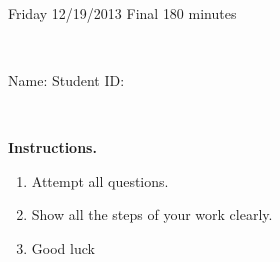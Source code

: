 \documentclass[12pt, oneside]{amsart}
\begin{document}
%

\begin{center}
    \hrulefill\\
    {\bf \textsf{\raisebox{-0.10cm}{Fall 2013: MATH 163} \hspace{\fill} 
            \raisebox{-0.10cm}{Ordinary Differential Equations} \hspace{\fill}
            \raisebox{-0.10cm}{David Karapetyan}}}\\
    \hrulefill\\
    {\large \rule{0cm}{1.2cm} \textsf{Friday 12/19/2013} \hfill
        \textsf{Final} \hfill  \textsf{180 minutes}}\\
    {\large\rule{0cm}{1.2cm}\textsf{Name: \framebox[2.9in]{\rule{0cm}{0.8cm}} 
            \hspace{\fill}
            Student ID: \framebox[2.1in]{\rule{0cm}{0.8cm}}}}\\
\end{center}
\vspace{0.8cm}

\noindent
{\bf \textsf{Instructions.}}

\begin{enumerate}
    \item Attempt all questions.   
    \item Show all the steps of your work clearly.  
    \item Good luck 
\end{enumerate}

\vfill

\end{document}
